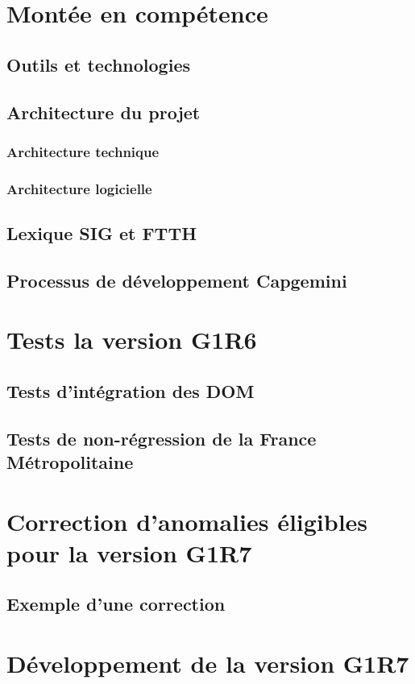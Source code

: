 \chapter{Montée en compétence}
\section{Outils et technologies}
\section{Architecture du projet}
\subsection{Architecture technique}
\subsection{Architecture logicielle}
\section{Lexique SIG et FTTH}
\section{Processus de développement Capgemini}
\chapter{Tests la version G1R6}
\section{Tests d'intégration des DOM}
\section{Tests de non-régression de la France Métropolitaine}
\chapter{Correction d'anomalies éligibles pour la version G1R7}
\section{Exemple d'une correction}
\chapter{Développement de la version G1R7}

